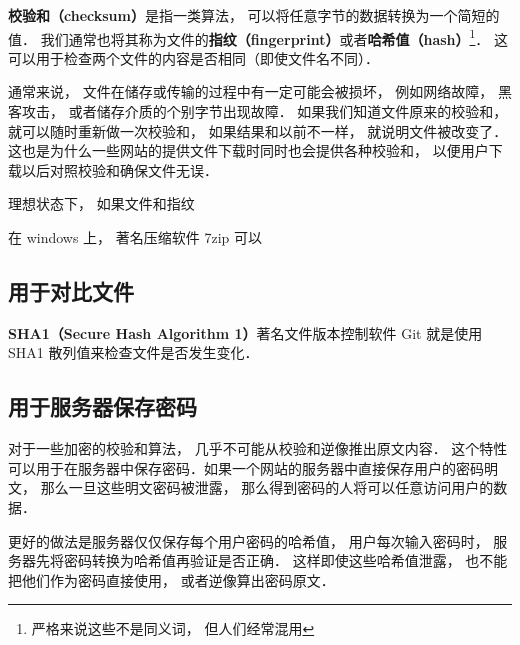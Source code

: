
\textbf{校验和（checksum）}是指一类算法， 可以将任意字节的数据转换为一个简短的值． 我们通常也将其称为文件的\textbf{指纹（fingerprint）}或者\textbf{哈希值（hash）}\footnote{严格来说这些不是同义词， 但人们经常混用}． 这可以用于检查两个文件的内容是否相同（即使文件名不同）． %

通常来说， 文件在储存或传输的过程中有一定可能会被损坏， 例如网络故障， 黑客攻击， 或者储存介质的个别字节出现故障． 如果我们知道文件原来的校验和， 就可以随时重新做一次校验和， 如果结果和以前不一样， 就说明文件被改变了． 这也是为什么一些网站的提供文件下载时同时也会提供各种校验和， 以便用户下载以后对照校验和确保文件无误．




理想状态下， 如果文件和指纹

在 windows 上， 著名压缩软件 7zip %
可以

\subsection{用于对比文件}
\textbf{SHA1（Secure Hash Algorithm 1）}著名文件版本控制软件 Git %
就是使用 SHA1 散列值来检查文件是否发生变化．

\subsection{用于服务器保存密码}
对于一些加密的校验和算法， 几乎不可能从校验和逆像推出原文内容． 这个特性可以用于在服务器中保存密码．如果一个网站的服务器中直接保存用户的密码明文， 那么一旦这些明文密码被泄露， 那么得到密码的人将可以任意访问用户的数据．

更好的做法是服务器仅仅保存每个用户密码的哈希值， 用户每次输入密码时， 服务器先将密码转换为哈希值再验证是否正确． 这样即使这些哈希值泄露， 也不能把他们作为密码直接使用， 或者逆像算出密码原文．
